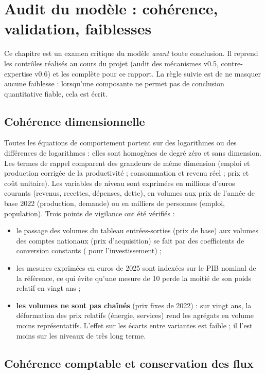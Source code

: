 \chapter{Audit du modèle : cohérence, validation, faiblesses}
\label{ch:audit}

Ce chapitre est un examen critique du modèle \emph{avant} toute conclusion. Il reprend les contrôles réalisés au cours
du projet (audit des mécanismes v0.5, contre-expertise v0.6) et les complète pour ce rapport. La règle suivie est de ne
masquer aucune faiblesse : lorsqu'une composante ne permet pas de conclusion quantitative fiable, cela est écrit.

\section{Cohérence dimensionnelle}

Toutes les équations de comportement portent sur des logarithmes ou des différences de logarithmes : elles sont
homogènes de degré zéro et sans dimension. Les termes de rappel comparent des grandeurs de même dimension (emploi et
production corrigée de la productivité ; consommation et revenu réel ; prix et coût unitaire). Les variables de niveau
sont exprimées en millions d'euros courants (revenus, recettes, dépenses, dette), en volumes aux prix de l'année de base
2022 (production, demande) ou en milliers de personnes (emploi, population). Trois points de vigilance ont été
vérifiés :
\begin{itemize}
\item le passage des volumes du tableau entrées-sorties (prix de base) aux volumes des comptes nationaux (prix
d'acquisition) se fait par des coefficients de conversion constants ( pour l'investissement) ;
\item les mesures exprimées en euros de 2025 sont indexées sur le PIB nominal de la référence, ce qui évite qu'une
mesure de 10\md{} perde la moitié de son poids relatif en vingt ans ;
\item \textbf{les volumes ne sont pas chaînés} (prix fixes de 2022) : sur vingt ans, la déformation des prix relatifs
(énergie, services) rend les agrégats en volume moins représentatifs. L'effet sur les écarts entre variantes est
faible ; il l'est moins sur les niveaux de très long terme.
\end{itemize}

\section{Cohérence comptable et conservation des flux}

